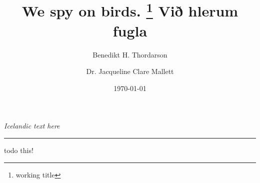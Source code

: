 \documentclass[11pt]{article} %
\title{We spy on birds. \thanks{working title} }
\title{Við hlerum fugla}
\date{\today}
\author{Benedikt H. Thordarson \and Dr. Jacqueline Clare Mallett }
\newif\ifenglish
\begin{document}

\maketitle %

\begin{center}
    \ifenglish
        \textit{A proposal to violate the privacy of forest dwelling birds.} \\
    \else
        \textit{Icelandic text here} 
    \fi
\end{center}
\noindent\rule{\linewidth}{\arrayrulewidth}

    \ifenglish     
        
    \else
        todo this!
    \fi

{}

\end{document}
